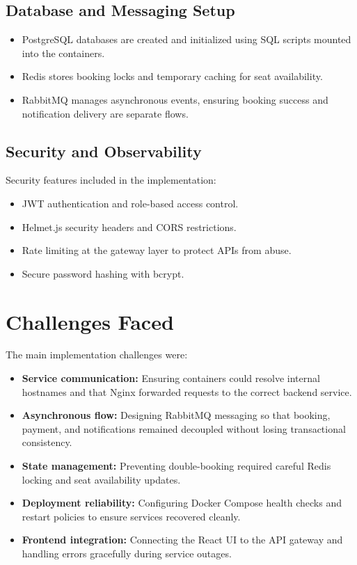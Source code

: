 \documentclass[12pt,a4paper]{article}
\begin{document}
\subsection{Database and Messaging Setup}
\begin{itemize}[itemsep=0.4em]
    \item PostgreSQL databases are created and initialized using SQL scripts mounted into the containers.
    \item Redis stores booking locks and temporary caching for seat availability.
    \item RabbitMQ manages asynchronous events, ensuring booking success and notification delivery are separate flows.
\end{itemize}

\subsection{Security and Observability}
Security features included in the implementation:
\begin{itemize}[itemsep=0.4em]
    \item JWT authentication and role-based access control.
    \item Helmet.js security headers and CORS restrictions.
    \item Rate limiting at the gateway layer to protect APIs from abuse.
    \item Secure password hashing with bcrypt.
\end{itemize}

\section{Challenges Faced}
The main implementation challenges were:
\begin{itemize}[itemsep=0.4em]
    \item \textbf{Service communication:} Ensuring containers could resolve internal hostnames and that Nginx forwarded requests to the correct backend service.
    \item \textbf{Asynchronous flow:} Designing RabbitMQ messaging so that booking, payment, and notifications remained decoupled without losing transactional consistency.
    \item \textbf{State management:} Preventing double-booking required careful Redis locking and seat availability updates.
    \item \textbf{Deployment reliability:} Configuring Docker Compose health checks and restart policies to ensure services recovered cleanly.
    \item \textbf{Frontend integration:} Connecting the React UI to the API gateway and handling errors gracefully during service outages.
\end{itemize}
\end{document}
